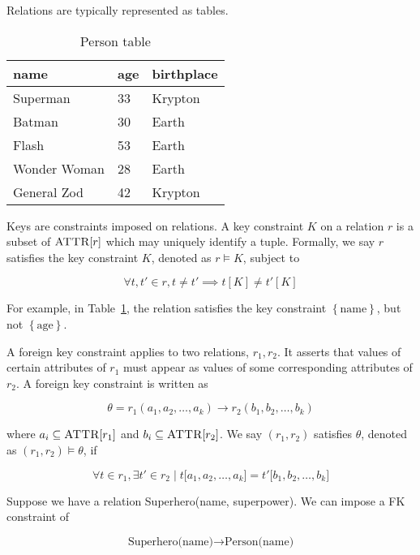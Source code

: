 	Relations are typically represented as tables.
	
	\begin{table}[!ht]
		\centering
		\begin{tabular}{lll}
			\toprule
			name & age & birthplace \\
			\midrule
			Superman & 33 & Krypton \\
			Batman & 30 & Earth \\
			Flash & 53 & Earth \\
			Wonder Woman & 28 & Earth \\
			General Zod & 42 & Krypton \\
			\bottomrule
		\end{tabular}
		
		\caption{Person table}
		\label{tbl:person}
	\end{table}
	
	\begin{defn}[Keys]
	\label{def:keys}
		Keys are constraints imposed on relations.  A key constraint $K$ on a relation $r$ is a subset of $\textsc{ATTR}\lbrack r\rbrack$ which may uniquely identify a tuple.  Formally, we say $r$ satisfies the key constraint $K$, denoted as $r \models K$, subject to
		
		$$\forall t, t' \in r, t \not= t' \implies t[K] \not= t'[K]$$
		
		For example, in Table~\ref{tbl:person}, the relation satisfies the key constraint $\left\{\mathrm{name}\right\}$, but not $\left\{\mathrm{age}\right\}$.
	\end{defn}
	
	\begin{defn}
	\label{def:foreign-keys}
		A foreign key constraint applies to two relations, $r_1, r_2$.  It asserts that values of certain attributes of $r_1$ must appear as values of some corresponding attributes of $r_2$.  A foreign key constraint is written as
		
		$$\theta = r_1(a_1, a_2, \dotsc, a_k) \rightarrow r_2(b_1, b_2, \dotsc, b_k)$$
		
		where $a_i \subseteq \textsc{ATTR}\lbrack r_1\rbrack$ and $b_i \subseteq \textsc{ATTR}\lbrack r_2\rbrack$.  We say $(r_1, r_2)$ satisfies $\theta$, denoted as $(r_1, r_2) \models \theta$, if
		
		$$\forall t \in r_1, \exists t' \in r_2 \mid t\lbrack a_1, a_2, \dotsc, a_k\rbrack = t'\lbrack b_1, b_2, \dotsc, b_k]$$
		
		\begin{ex}
			Suppose we have a relation Superhero(name, superpower).  We can impose a FK constraint of
			
			$$\textrm{Superhero(name)} \rightarrow \textrm{Person(name)}$$
		\end{ex}
	\end{defn}
	
